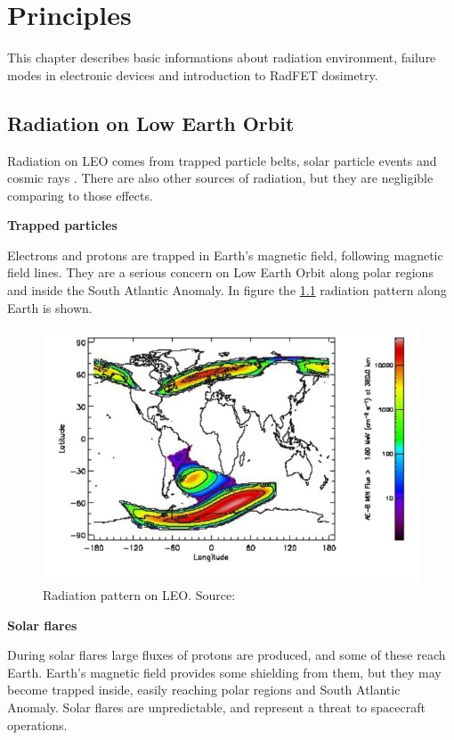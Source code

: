 \chapter{Principles}

This chapter describes basic informations about radiation environment, failure modes in electronic devices and introduction to RadFET dosimetry.

\section{Radiation on Low Earth Orbit}
    Radiation on LEO comes from trapped particle belts, solar particle events and cosmic rays \cite{ESA_radiation}. There are also other sources of radiation, but they are negligible comparing to those effects.

    \bigskip \textbf{Trapped particles}

    Electrons and protons are trapped in Earth's magnetic field, following magnetic field lines. They are a serious concern on Low Earth Orbit along polar regions and inside the South Atlantic Anomaly. In figure the \ref{Polar_SAA} radiation pattern along Earth is shown.

    \begin{figure}[H]
        \centering
        \includegraphics[width=0.6\paperwidth]{img/03/polar_SAA.png}
        \caption{Radiation pattern on LEO. Source: \cite{ESA_radiation}}
         \label{Polar_SAA}
    \end{figure}

    \bigskip \textbf{Solar flares}

    During solar flares large fluxes of protons are produced, and some of these reach Earth. Earth's magnetic field provides some shielding from them, but they may become trapped inside, easily reaching polar regions and South Atlantic Anomaly. Solar flares are unpredictable, and represent a threat to spacecraft operations.

